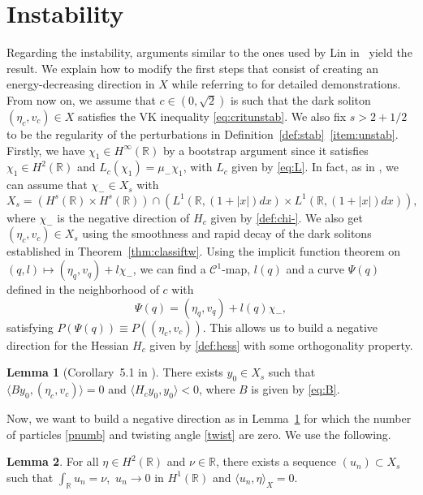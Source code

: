 \documentclass[11pt]{article}
\newcommand{\R}{\mathbb{R}}
\newcommand{\boC}{\mathcal{C}}
\theoremstyle{plain}
\theoremstyle{definition}
\newtheorem{lemma}{Lemma}
\theoremstyle{remark}
\numberwithin{equation}{section}
\begin{document}
{	\section{Instability}\label{sec:instab}
	Regarding the instability, arguments similar to the ones used by Lin in~\cite{linbubbles} yield the result. We explain how to modify the first steps that consist of creating an energy-decreasing direction in $X$ while referring to \cite{linbubbles} for detailed demonstrations. From now on, we assume that $c\in(0,\sqrt{2})$ is such that the dark soliton $(\eta_c,v_c)\in X$ satisfies the VK inequality \eqref{eq:critunstab}. We also fix $s>2+1/2$ to be the regularity of the perturbations in Definition~\ref{def:stab}~\eqref{item:unstab}.   
	Firstly, we have $\chi_1\in  H^\infty(\R)$ by a bootstrap argument since it satisfies $\chi_1\in H^2(\R)$ and $L_c(\chi_1)=\mu_-\chi_1$, with $L_c$  given by \eqref{eq:L}. In fact, as in \cite{linbubbles}, we can assume that $\chi_-\in X_s$ with
	\begin{equation}\label{def:Xs}
		X_s=( H^{s}(\R)\times H^{{s}}(\R))\cap( L^1(\R,(1+|x|)dx)\times L^1(\R,(1+|x|)dx)),
	\end{equation} where $\chi_-$ is the negative direction of $H_c$ given by \eqref{def:chi-}. We also get $(\eta_c,v_c)\in X_s$ using the smoothness and rapid decay of the dark solitons established in Theorem~\ref{thm:classiftw}.  Using the implicit function theorem on $(q,l)\mapsto(\eta_q,v_q)+l\chi_-$, we can find a $\boC^1$-map, $l(q)$ and a curve $\Psi(q)$ defined in the neighborhood of $c$ with \begin{equation}\label{eq:minunstab}
		\Psi(q)=(\eta_q,v_q)+l(q)\chi_-,
	\end{equation}satisfying $P(\Psi(q))\equiv P((\eta_c,v_c))$. This allows us to build a negative direction for the Hessian $H_c$ given by \eqref{def:hess}  with some orthogonality property.
	\begin{lemma}[Corollary~5.1 in \cite{linbubbles}]\label{lem:y0}
		There exists $y_0\in X_s$ such that $\langle By_0,(\eta_c,v_c)\rangle=0$ and $\langle H_cy_0,y_0\rangle<0$, where $B$ is given by \eqref{eq:B}.
	\end{lemma}
	Now, we want to build a negative direction as in Lemma~\ref{lem:y0} for which the number of particles \eqref{pnumb} and twisting angle \eqref{twist} are zero. We use the following.
	\begin{lemma}\label{lem:orthint}
		For all $\eta\in H^2(\R)$ and $\nu\in\R$, there exists a sequence $(u_n)\subset X_s$ such that $\int_\R u_n=\nu$,~$u_n\to0$ in $ H^1(\R)$ and $\langle u_n,\eta\rangle_X=0$.

\end{lemma}}
\end{document}
